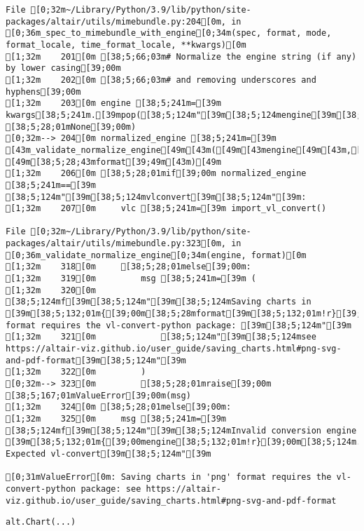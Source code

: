 \documentclass[
  letterpaper,
  DIV=11,
  numbers=noendperiod]{scrartcl}
\begin{document}
\begin{verbatim}
File [0;32m~/Library/Python/3.9/lib/python/site-packages/altair/utils/mimebundle.py:204[0m, in [0;36m_spec_to_mimebundle_with_engine[0;34m(spec, format, mode, format_locale, time_format_locale, **kwargs)[0m
[1;32m    201[0m [38;5;66;03m# Normalize the engine string (if any) by lower casing[39;00m
[1;32m    202[0m [38;5;66;03m# and removing underscores and hyphens[39;00m
[1;32m    203[0m engine [38;5;241m=[39m kwargs[38;5;241m.[39mpop([38;5;124m"[39m[38;5;124mengine[39m[38;5;124m"[39m, [38;5;28;01mNone[39;00m)
[0;32m--> 204[0m normalized_engine [38;5;241m=[39m [43m_validate_normalize_engine[49m[43m([49m[43mengine[49m[43m,[49m[43m [49m[38;5;28;43mformat[39;49m[43m)[49m
[1;32m    206[0m [38;5;28;01mif[39;00m normalized_engine [38;5;241m==[39m [38;5;124m"[39m[38;5;124mvlconvert[39m[38;5;124m"[39m:
[1;32m    207[0m     vlc [38;5;241m=[39m import_vl_convert()

File [0;32m~/Library/Python/3.9/lib/python/site-packages/altair/utils/mimebundle.py:323[0m, in [0;36m_validate_normalize_engine[0;34m(engine, format)[0m
[1;32m    318[0m     [38;5;28;01melse[39;00m:
[1;32m    319[0m         msg [38;5;241m=[39m (
[1;32m    320[0m             [38;5;124mf[39m[38;5;124m"[39m[38;5;124mSaving charts in [39m[38;5;132;01m{[39;00m[38;5;28mformat[39m[38;5;132;01m!r}[39;00m[38;5;124m format requires the vl-convert-python package: [39m[38;5;124m"[39m
[1;32m    321[0m             [38;5;124m"[39m[38;5;124msee https://altair-viz.github.io/user_guide/saving_charts.html#png-svg-and-pdf-format[39m[38;5;124m"[39m
[1;32m    322[0m         )
[0;32m--> 323[0m         [38;5;28;01mraise[39;00m [38;5;167;01mValueError[39;00m(msg)
[1;32m    324[0m [38;5;28;01melse[39;00m:
[1;32m    325[0m     msg [38;5;241m=[39m [38;5;124mf[39m[38;5;124m"[39m[38;5;124mInvalid conversion engine [39m[38;5;132;01m{[39;00mengine[38;5;132;01m!r}[39;00m[38;5;124m. Expected vl-convert[39m[38;5;124m"[39m

[0;31mValueError[0m: Saving charts in 'png' format requires the vl-convert-python package: see https://altair-viz.github.io/user_guide/saving_charts.html#png-svg-and-pdf-format
\end{verbatim}

\begin{verbatim}
alt.Chart(...)
\end{verbatim}
\end{document}
